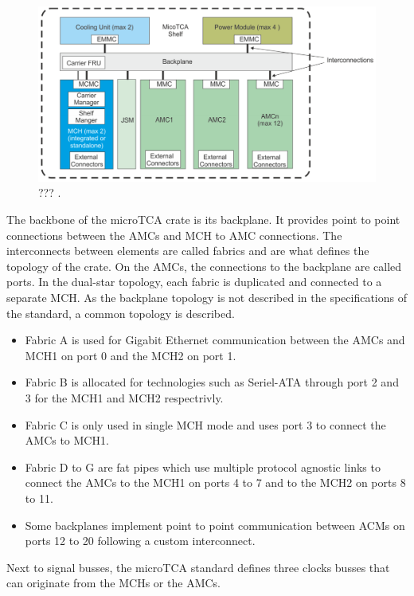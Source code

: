       \begin{figure}[h!]
        \centering
        \includegraphics[width=\textwidth]{img/II-2-daq/utca-crate.png}
        \caption{??? \cite{VADATECH}.}
        \label{fig:II-2-daq-utca-crate}
      \end{figure}

      The backbone of the microTCA crate is its backplane. It provides point to point connections between the AMCs and MCH to AMC connections. The interconnects between elements are called fabrics and are what defines the topology of the crate. On the AMCs, the connections to the backplane are called ports. In the dual-star topology, each fabric is duplicated and connected to a separate MCH. As the backplane topology is not described in the specifications of the standard, a common topology is described.
      \begin{itemize}
        \item Fabric A is used for Gigabit Ethernet communication between the AMCs and MCH1 on port 0 and the MCH2 on port 1.
        \item Fabric B is allocated for technologies such as Seriel-ATA through port 2 and 3 for the MCH1 and MCH2 respectrivly.
        \item Fabric C is only used in single MCH mode and uses port 3 to connect the AMCs to MCH1.
        \item Fabric D to G are fat pipes which use multiple protocol agnostic links to connect the AMCs to the MCH1 on ports 4 to 7 and to the MCH2 on ports 8 to 11.
        \item Some backplanes implement point to point communication between ACMs on ports 12 to 20 following a custom interconnect.
      \end{itemize}
      Next to signal busses, the microTCA standard defines three clocks busses that can originate from the MCHs or the AMCs.


